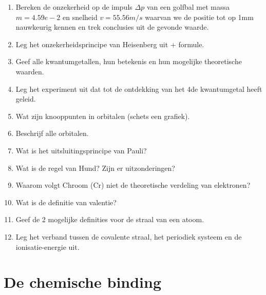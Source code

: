 \documentclass[a4paper,12pt]{article}
\begin{document}
    \begin{enumerate}
        \item Bereken de onzekerheid op de impuls $\Delta p$ van een golfbal met massa $m = 4.59e-2$ en
        snelheid $v = 55.56 m/s$ waarvan we de positie tot op 1mm nauwkeurig kennen en trek conclusies uit de gevonde waarde.
        \item Leg het onzekerheidsprincipe van Heisenberg uit + formule.
        \item Geef alle kwantumgetallen, hun betekenis en hun mogelijke theoretische waarden.
        \item Leg het experiment uit dat tot de ontdekking van het 4de kwantumgetal heeft geleid.
        \item Wat zijn knooppunten in orbitalen (schets een grafiek).
        \item Beschrijf alle orbitalen.
        \item Wat is het uitsluitingsprincipe van Pauli?
        \item Wat is de regel van Hund? Zijn er uitzonderingen?
        \item Waarom volgt Chroom (Cr) niet de theoretische verdeling van elektronen?
        \item Wat is de definitie van valentie?
        \item Geef de 2 mogelijke definities voor de straal van een atoom.
        \item Leg het verband tussen de covalente straal, het periodiek systeem en de ionisatie-energie uit.
    \end{enumerate}

    \section{De chemische binding}
\end{document}
